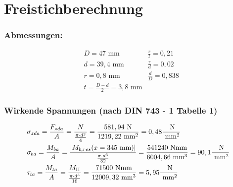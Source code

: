 \section{Freistichberechnung}
\subsubsection{Abmessungen:}
\begin{align*}
	&D= 47 \text{ mm} & \frac{r}{t} = 0,21 \\
	&d= 39,4 \text{ mm} & \frac{r}{d} = 0,02 \\
	& r= 0,8 \text{ mm} & \frac{d}{D} = 0,838 \\
	& t= \frac{D-d}{2} = 3,8 \text{ mm} 
\end{align*}
\subsubsection{Wirkende Spannungen (nach DIN 743 - 1 Tabelle 1)}
\begin{align*}
	&\sigma_{zda} = \frac{F_{zda}}{A} = \frac{N}{\frac{\pi \cdot d^2}{4}} = \frac{581,94 \text{ N}}{1219,22 \text{ mm}^2} = 0,48 \frac{\text{ N}}{\text{ mm}^2} \\
	&\sigma_{ba} = \frac{M_{ba}}{A} = \frac{|M_{b,res}(x=345 \text{ mm}) |}{\frac{\pi \cdot d^3}{32}} = \frac{541240 \text{ Nmm}}{6004,66 \text{ mm}^3} = 90,1 \frac{\text{ N}}{\text{ mm}^2} \\
	&\tau_{ta} = \frac{M_{ta}}{A} = \frac{M_{\mathrm{II}}}{\frac{\pi \cdot d^3}{16}} = \frac{71500 \text{ Nmm}}{12009,32 \text{ mm}^3} = 5,95 \frac{\text{ N}}{\text{ mm}^2} 
\end{align*}
